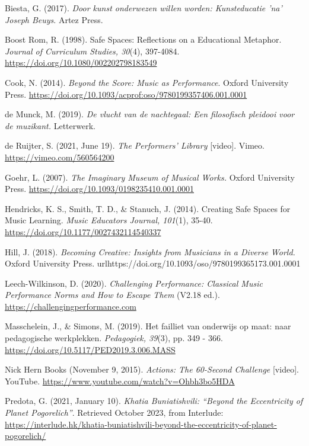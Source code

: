 \documentclass[authordate, empirical, issue]{jote-new-article}
\begin{document}
Biesta, G. (2017). \emph{Door kunst onderwezen willen worden: Kunsteducatie 'na' Joseph Beuys}. Artez Press.



Boost Rom, R. (1998). Safe Spaces: Reflections on a Educational Metaphor. \emph{Journal of Curriculum Studies, 30}(4), 397-4084. \url{https://doi.org/10.1080/002202798183549}



Cook, N. (2014). \emph{Beyond the Score: Music as Performance}. Oxford University Press. \url{https://doi.org/10.1093/acprof:oso/9780199357406.001.0001}



de Munck, M. (2019). \emph{De vlucht van de nachtegaal: Een filosofisch pleidooi voor de muzikant.} Letterwerk.



de Ruijter, S. (2021, June 19). \emph{The Performers' Library }[video]. Vimeo. \url{https://vimeo.com/560564200}



Goehr, L. (2007). \emph{The Imaginary Museum of Musical Works.} Oxford University Press. \url{https://doi.org/10.1093/0198235410.001.0001}



Hendricks, K. S., Smith, T. D., \& Stanuch, J. (2014). Creating Safe Spaces for Music Learning. \emph{Music Educators Journal, 101}(1), 35-40. \url{https://doi.org/10.1177/0027432114540337}



Hill, J. (2018). \emph{Becoming Creative: Insights from Musicians in a Diverse World.} Oxford University Press. url{https://doi.org/10.1093/oso/9780199365173.001.0001}



Leech-Wilkinson, D. (2020). \emph{Challenging Performance: Classical Music Performance Norms and How to Escape Them} (V2.18 ed.). \url{https://challengingperformance.com}



Masschelein, J., \& Simons, M. (2019). Het failliet van onderwijs op maat: naar pedagogische werkplekken. \emph{Pedagogiek, 39}(3), pp. 349 - 366. \url{https://doi.org/10.5117/PED2019.3.006.MASS}



Nick Hern Books (November 9, 2015). \emph{Actions: The 60-Second Challenge }[video]. YouTube. \url{https://www.youtube.com/watch?v=Ohbh3bo5HDA}



Predota, G. (2021, January 10). \emph{Khatia Buniatishvili: “Beyond the Eccentricity of Planet Pogorelich”}. Retrieved October 2023, from Interlude: \href{https://interlude.hk/khatia-buniatishvili-beyond-the-eccentricity-of-planet-pogorelich/}{https://interlude.hk/khatia-buniatishvili-beyond-the-eccentricity-of-planet-pogorelich/}
\end{document}
